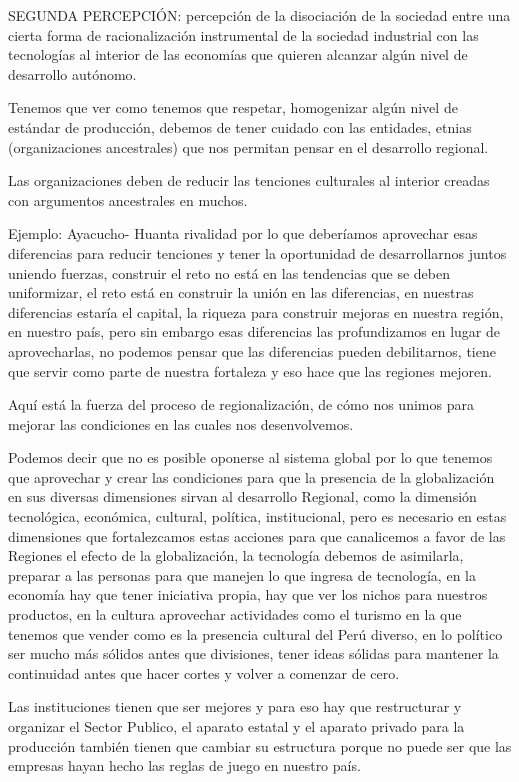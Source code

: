 \documentclass[
  a4paper,
]{article}
\begin{document}
SEGUNDA PERCEPCIÓN: percepción de la disociación de la sociedad entre
una cierta forma de racionalización instrumental de la sociedad
industrial con las tecnologías al interior de las economías que quieren
alcanzar algún nivel de desarrollo autónomo.

Tenemos que ver como tenemos que respetar, homogenizar algún nivel de
estándar de producción, debemos de tener cuidado con las entidades,
etnias (organizaciones ancestrales) que nos permitan pensar en el
desarrollo regional.

Las organizaciones deben de reducir las tenciones culturales al interior
creadas con argumentos ancestrales en muchos.

Ejemplo: Ayacucho- Huanta rivalidad por lo que deberíamos aprovechar
esas diferencias para reducir tenciones y tener la oportunidad de
desarrollarnos juntos uniendo fuerzas, construir el reto no está en las
tendencias que se deben uniformizar, el reto está en construir la unión
en las diferencias, en nuestras diferencias estaría el capital, la
riqueza para construir mejoras en nuestra región, en nuestro país, pero
sin embargo esas diferencias las profundizamos en lugar de
aprovecharlas, no podemos pensar que las diferencias pueden
debilitarnos, tiene que servir como parte de nuestra fortaleza y eso
hace que las regiones mejoren.

Aquí está la fuerza del proceso de regionalización, de cómo nos unimos
para mejorar las condiciones en las cuales nos desenvolvemos.

Podemos decir que no es posible oponerse al sistema global por lo que
tenemos que aprovechar y crear las condiciones para que la presencia de
la globalización en sus diversas dimensiones sirvan al desarrollo
Regional, como la dimensión tecnológica, económica, cultural, política,
institucional, pero es necesario en estas dimensiones que fortalezcamos
estas acciones para que canalicemos a favor de las Regiones el efecto de
la globalización, la tecnología debemos de asimilarla, preparar a las
personas para que manejen lo que ingresa de tecnología, en la economía
hay que tener iniciativa propia, hay que ver los nichos para nuestros
productos, en la cultura aprovechar actividades como el turismo en la
que tenemos que vender como es la presencia cultural del Perú diverso,
en lo político ser mucho más sólidos antes que divisiones, tener ideas
sólidas para mantener la continuidad antes que hacer cortes y volver a
comenzar de cero.

Las instituciones tienen que ser mejores y para eso hay que restructurar
y organizar el Sector Publico, el aparato estatal y el aparato privado
para la producción también tienen que cambiar su estructura porque no
puede ser que las empresas hayan hecho las reglas de juego en nuestro
país.
\end{document}
